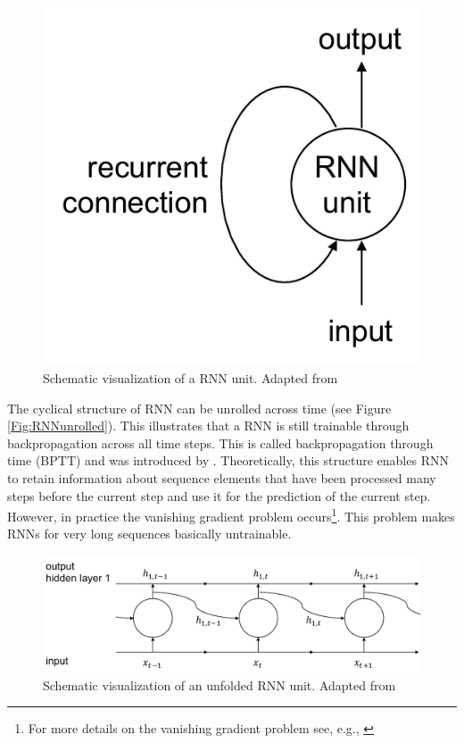 %
\begin{figure}
    \centering
    \includegraphics[scale=0.6]{thesis/figures/RNNunit.pdf}
    \caption[Schematic visualization of a RNN unit]{Schematic visualization of a RNN unit. Adapted from \citet{chollet:2018}}
    \label{Fig:RNNunit}
\end{figure}

The cyclical structure of RNN can be unrolled across time (see Figure \ref{Fig:RNNunrolled}). This illustrates that a RNN is still trainable through backpropagation across all time steps. This is called backpropagation through time (BPTT) and was introduced by \citet{Werbos:1990}. Theoretically, this structure enables RNN to retain information about sequence elements that have been processed many steps before the current step and use it for the prediction of the current step. However, in practice the vanishing gradient problem occurs\footnote{For more details on the vanishing gradient problem see, e.g., \citet{Bengio:1994}}. This problem makes RNNs for very long sequences basically untrainable.

\begin{figure}
    \centering
    \includegraphics[scale=0.6]{thesis/figures/RNNunfolded.pdf}
    \caption[Schematic visualization of an unfolded RNN unit]{Schematic visualization of an unfolded RNN unit. Adapted from \citet{chollet:2018}}
    \label{Fig:RNNunit}
\end{figure}

